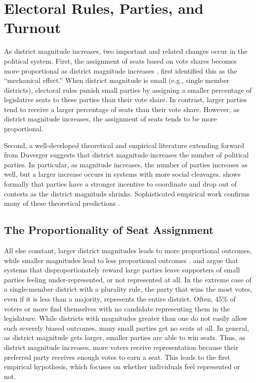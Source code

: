 \documentclass[12pt]{article}
\begin{document}
\section*{Electoral Rules, Parties, and Turnout}

As district magnitude increases, two important and related changes occur in the political system. First, the assignment of seats based on vote shares becomes more proportional as district magnitude increases \citep{Cox1997, Benoit2000}. \cite{Duverger1954} first identified this as the ``mechanical effect.'' When district magnitude is small (e.g., single member districts), electoral rules punish small parties by assigning a smaller percentage of legislative seats to these parties than their vote share. In contrast, larger parties tend to receive a larger percentage of seats than their vote share. However, as district magnitude increases, the assignment of seats tends to be more proportional. 

Second, a well-developed theoretical and empirical literature extending forward from Duverger suggests that district magnitude increases the number of political parties. In particular, as magnitude increases, the number of parties increases as well, but a larger increase occurs in systems with more social cleavages.   \cite{Cox1999} shows formally that parties have a stronger incentive to coordinate and drop out of contests as the district magnitude shrinks. Sophisticated empirical work confirms many of these theoretical predictions \citep[e.g.][]{ClarkGolder2006}.

\subsection*{The Proportionality of Seat Assignment}

All else constant, larger district magnitudes leads to more proportional outcomes, while smaller magnitudes lead to less proportional outcomes \citep{Cox1997, Benoit2000}. \cite{Banduccietal1999} and \cite{BowlerLanoue1992} argue that systems that disproportionately reward large parties leave supporters of small parties feeling under-represented, or not represented at all. In the extreme case of a single-member district with a plurality rule, the party that wins the most votes, even if it is less than a majority, represents the entire district. Often, 45\% of voters or more find themselves with no candidate representing them in the legislature. While districts with magnitudes greater than one do not easily allow such severely biased outcomes, many small parties get no seats at all. In general, as district magnitude gets larger, smaller parties are able to win seats. Thus, as district magnitude increases, more voters receive representation because their preferred party receives enough votes to earn a seat. This leads to the first empirical hypothesis, which focuses on whether individuals feel represented or not.
\end{document}
